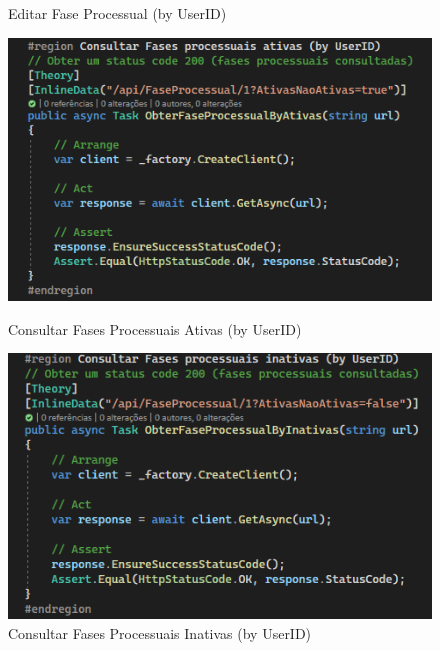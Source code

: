 \begin{figure}[!htbp]
\begin{minipage}[b]{0.4\textwidth}
    \caption{Editar Fase Processual (by UserID)}
    \label{d.unitario}
  \end{minipage}
  \centering
  \begin{minipage}[b]{0.4\textwidth}
    \includegraphics[width=\textwidth]{Figuras/TestesUnitarios/FaseProcessual/Consultar Fases Processuais Ativas.png}
    \caption{Consultar Fases Processuais Ativas (by UserID)}
    \label{d.unitario}
  \end{minipage}
  \hfill
  \begin{minipage}[b]{0.4\textwidth}
    \includegraphics[width=\textwidth]{Figuras/TestesUnitarios/FaseProcessual/Consultar Fases Processuais Inativas.png}
    \caption{Consultar Fases Processuais Inativas (by UserID)}
    \label{d.unitario}
  \end{minipage}
  \centering
  \begin{minipage}[b]{0.4\textwidth}

\end{minipage}
\end{figure}
